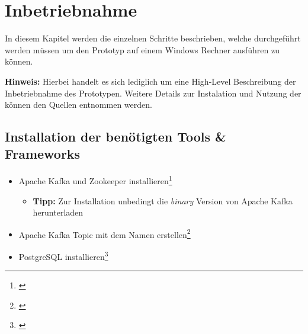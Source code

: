 \chapter{Inbetriebnahme}
\label{chap:betrieb}
In diesem Kapitel werden die einzelnen Schritte beschrieben, welche durchgeführt werden müssen um den Prototyp auf einem Windows Rechner ausführen zu können.

\textbf{Hinweis:}
\newline
Hierbei handelt es sich lediglich um eine High-Level Beschreibung der Inbetriebnahme des Prototypen.
Weitere Details zur Instalation und Nutzung der können den Quellen entnommen werden.
\newline

\section{Installation der benötigten Tools \& Frameworks}
\begin{itemize}
  \item Apache Kafka und Zookeeper installieren\footnote{\cite{Apache}}
  \begin{itemize}
    \item \textbf{Tipp:} Zur Installation unbedingt die \textit{binary} Version von Apache Kafka herunterladen
  \end{itemize}
  \item Apache Kafka Topic mit dem Namen  erstellen\footnote{\cite{ApacheTopic}}
  \item PostgreSQL installieren\footnote{\cite{PostgreSQL}}
\end{itemize}

